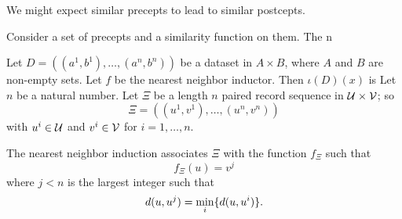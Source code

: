 

We might expect similar precepts to lead to similar postcepts.


Consider a set of precepts and a similarity function on them.
The n


Let $D = ((a^1, b^1), \dots, (a^n, b^n))$ be a dataset in $A \times B$, where $A$ and $B$ are non-empty sets.
Let $f$ be the nearest neighbor inductor.
Then $\iota(D)(x)$ is
Let $n$ be a natural number.
Let $\Xi$ be a length $n$ paired record sequence
in $\mathcal{U} \times \mathcal{V}$; so
\[
  \Xi = ((u^1, v^1), \dots, (u^n, v^n))
\]
with $u^i \in \mathcal{U}$ and $v^i \in \mathcal{V}$ for $i = 1,\dots,n$.

The nearest neighbor induction associates
$\Xi$ with the function $f_{\Xi}$ such that
\[
  f_{\Xi}(u) = v^j
\]
where $j < n$ is the largest integer such that
\[
  d(u, u^j) = \min_{i} \{d(u, u^i)\}.
\]
